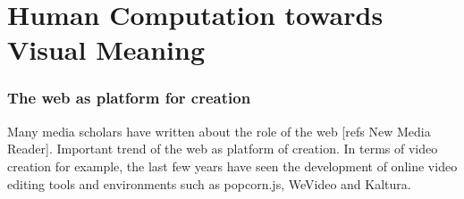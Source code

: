 \chapter{Human Computation towards Visual Meaning}
\label{ch:Human Computation}

\subsection{The web as platform for creation}
\label{sec:platform}
Many media scholars have written about the role of the web [refs New Media Reader].
Important trend of the web as platform of creation. In terms of video creation for example, the last few years have seen the development of online video editing tools and environments such as popcorn.js, WeVideo and Kaltura.
